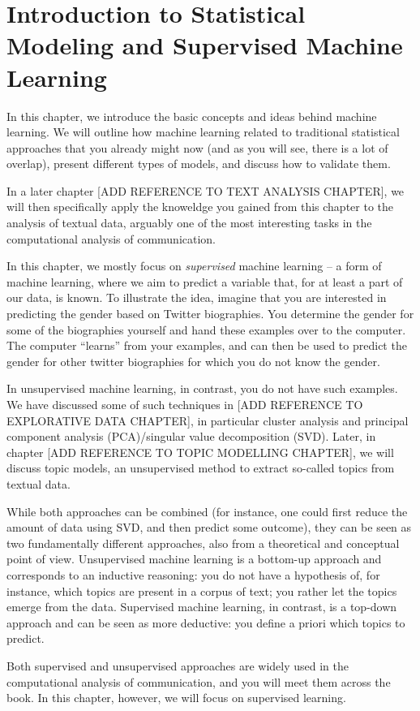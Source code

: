 \chapter{Introduction to Statistical Modeling and Supervised Machine Learning}

In this chapter, we introduce the basic concepts and ideas behind machine learning.
We will outline how machine learning related to traditional statistical approaches that you already might now (and as you will see, there is a lot of overlap), present different types of models, and discuss how to validate them.

In a later chapter [ADD REFERENCE TO TEXT ANALYSIS CHAPTER], we will then specifically apply the knoweldge you gained from this chapter to the analysis of textual data, arguably one of the most interesting tasks in the computational analysis of communication.

In this chapter, we mostly focus on \emph{supervised} machine learning -- a form of machine learning, where we aim to predict a variable that, for at least a part of our data, is known. To illustrate the idea, imagine that you are interested in predicting the gender based on Twitter biographies. You determine the gender for some of the biographies yourself and hand these examples over to the computer. The computer ``learns'' from your examples, and can then be used to predict the gender for other twitter biographies for which you do not know the gender.

In unsupervised machine learning, in contrast, you do not have such examples. We have discussed some of such techniques in [ADD REFERENCE TO EXPLORATIVE DATA CHAPTER], in particular cluster analysis and principal component analysis (PCA)/singular value decomposition (SVD).
Later, in chapter [ADD REFERENCE TO TOPIC MODELLING CHAPTER], we will discuss topic models, an unsupervised method to extract so-called topics from textual data.

While both approaches can be combined (for instance, one could first reduce the amount of data using SVD, and then predict some outcome), they can be seen as two fundamentally different approaches, also from a theoretical and conceptual point of view.
Unsupervised machine learning is a bottom-up approach and corresponds to an inductive reasoning: you do not have a hypothesis of, for instance, which topics are present in a corpus of text; you rather let the topics emerge from the data.
Supervised machine learning, in contrast, is a top-down approach and can be seen as more deductive: you define a priori which topics to predict.

Both supervised and unsupervised approaches are widely used in the computational analysis of communication, and you will meet them across the book.
In this chapter, however, we will focus on supervised learning.








